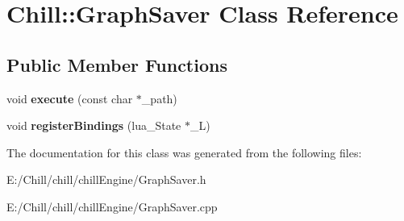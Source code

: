 \hypertarget{class_chill_1_1_graph_saver}{}\section{Chill\+:\+:Graph\+Saver Class Reference}
\label{class_chill_1_1_graph_saver}
\subsection*{Public Member Functions}
\begin{DoxyCompactItemize}
\item 
\mbox{\label{class_chill_1_1_graph_saver_a7a756b52e41c7df7057f138781800859}} 
void {\bfseries execute} (const char $\ast$\+\_\+path)
\item 
\mbox{\label{class_chill_1_1_graph_saver_aad11a2eab9b5d2a313e6435a18bb1069}} 
void {\bfseries register\+Bindings} (lua\+\_\+\+State $\ast$\+\_\+L)
\end{DoxyCompactItemize}


The documentation for this class was generated from the following files\+:\begin{DoxyCompactItemize}
\item 
E\+:/\+Chill/chill/chill\+Engine/Graph\+Saver.\+h\item 
E\+:/\+Chill/chill/chill\+Engine/Graph\+Saver.\+cpp\end{DoxyCompactItemize}
